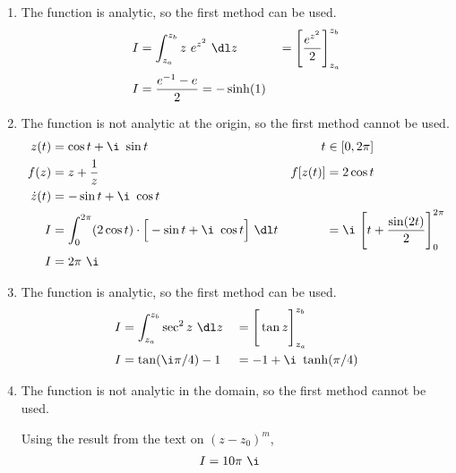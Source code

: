 \begin{enumerate}
    \item The function is \textcolor{y_h}{analytic}, so the first method can be used.
          \begin{align}
              I & = \int_{z_a}^{z_b} z\ e^{z^2} \ \dl z         &
                & = \Bigg[ \frac{e^{z^2}}{2} \Bigg]_{z_a}^{z_b}   \\
              I & = \frac{e^{-1} - e}{2} = -\sinh(1)
          \end{align}

    \item The function is \textcolor{y_p}{not analytic} at the origin,
          so the first method cannot be used.
          \begin{align}
              z(t)       & = \cos t + \i\ \sin t                               &
              t          & \in [0,2\pi]                                          \\
              f(z)       & = z + \frac{1}{z}                                   &
              f[z(t)]    & = 2\cos t                                             \\
              \dot{z}(t) & = -\sin t + \i\ \cos t                                \\
              I          & = \int_{0}^{2\pi} (2\cos t) \cdot
              \Big[-\sin t + \i\ \cos t\Big]
              \ \dl t    &
                         & = \i\ \Bigg[ t + \frac{\sin(2t)}{2} \Bigg]_0^{2\pi}   \\
              I          & = 2\pi\ \i
          \end{align}

    \item The function is \textcolor{y_h}{analytic}, so the first method can be used.
          \begin{align}
              I & = \int_{z_a}^{z_b} \sec^2 z \ \dl z &
                & = \Bigg[ \tan z \Bigg]_{z_a}^{z_b}    \\
              I & = \tan(\i\pi/4) - 1                 &
                & =  -1 + \i\ \tanh(\pi/4)
          \end{align}

    \item The function is \textcolor{y_p}{not analytic} in the domain,
          so the first method cannot be used. \par
          Using the result from the text on $ (z - z_0)^m $,
          \begin{align}
              I & = 10\pi\ \i
          \end{align}


\end{enumerate}
